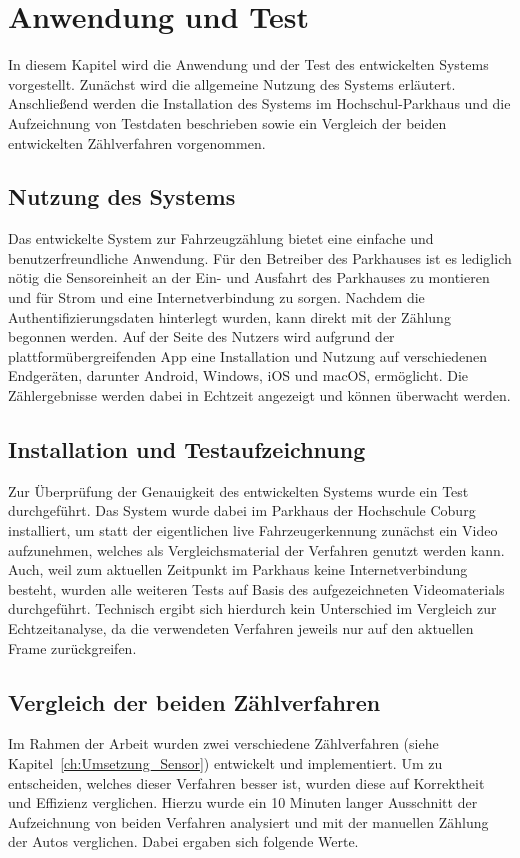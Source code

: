 \section{Anwendung und Test}\label{ch:Test}

In diesem Kapitel wird die Anwendung und der Test des entwickelten Systems vorgestellt.
Zunächst wird die allgemeine Nutzung des Systems erläutert.
Anschließend werden die Installation des Systems im Hochschul-Parkhaus und die Aufzeichnung von Testdaten beschrieben sowie ein Vergleich der beiden entwickelten Zählverfahren vorgenommen.

\subsection{Nutzung des Systems}
Das entwickelte System zur Fahrzeugzählung bietet eine einfache und benutzerfreundliche Anwendung.
Für den Betreiber des Parkhauses ist es lediglich nötig die Sensoreinheit an der Ein- und Ausfahrt des Parkhauses zu montieren und für Strom und eine Internetverbindung zu sorgen.
Nachdem die Authentifizierungsdaten hinterlegt wurden, kann direkt mit der Zählung begonnen werden.
Auf der Seite des Nutzers wird aufgrund der plattformübergreifenden App eine Installation und Nutzung auf verschiedenen Endgeräten, darunter Android, Windows, iOS und macOS, ermöglicht.
Die Zählergebnisse werden dabei in Echtzeit angezeigt und können überwacht werden.

\subsection{Installation und Testaufzeichnung}
Zur Überprüfung der Genauigkeit des entwickelten Systems wurde ein Test durchgeführt.
Das System wurde dabei im Parkhaus der Hochschule Coburg installiert, um statt der eigentlichen live Fahrzeugerkennung zunächst ein Video aufzunehmen, welches als Vergleichsmaterial der Verfahren genutzt werden kann.
Auch, weil zum aktuellen Zeitpunkt im Parkhaus keine Internetverbindung besteht, wurden alle weiteren Tests auf Basis des aufgezeichneten Videomaterials durchgeführt.
Technisch ergibt sich hierdurch kein Unterschied im Vergleich zur Echtzeitanalyse, da die verwendeten Verfahren jeweils nur auf den aktuellen Frame zurückgreifen.

\subsection{Vergleich der beiden Zählverfahren}
Im Rahmen der Arbeit wurden zwei verschiedene Zählverfahren (siehe Kapitel~\ref{ch:Umsetzung_Sensor}) entwickelt und implementiert.
Um zu entscheiden, welches dieser Verfahren besser ist, wurden diese auf Korrektheit und Effizienz verglichen.
Hierzu wurde ein 10 Minuten langer Ausschnitt der Aufzeichnung von beiden Verfahren analysiert und mit der manuellen Zählung der Autos verglichen.
Dabei ergaben sich folgende Werte.

